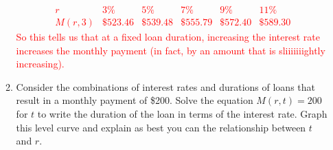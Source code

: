 \documentclass[10pt]{article}
\newcommand{\red}[1]{ %
\textcolor{red}{#1} }%
\begin{document}
\begin{enumerate}[leftmargin=0pt]
\begin{enumerate}
        \red{
        \[
        \begin{array}{c|c|c|c|c|c}
            r       & 3\%      & 5\%      & 7\%      & 9\%      & 11\%     \\ \hline
            M(r, 3) & \$523.46 & \$539.48 & \$555.79 & \$572.40 & \$589.30
        \end{array}
        \]
        So this tells us that at a fixed loan duration, increasing the interest rate increases the monthly payment (in fact, by an amount that is sliiiiiiightly increasing).
        }
        \item Consider the combinations of interest rates and durations of loans that result in a monthly payment of \$200. Solve the equation $M(r, t) = 200$ for $t$ to write the duration of the loan in terms of the interest rate. Graph this level curve and explain as best you can the relationship between $t$ and $r$.
        

\end{enumerate}
\end{enumerate}
\end{document}
